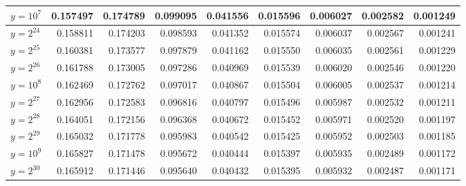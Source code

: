 \documentclass{article}
\theoremstyle{definition}
\begin{document}
\begin{table}[h!]
{\begin{tabular}{l|rrrrrrrr}
            \hline
            $y = 10^{7}$             & 0.157497 & 0.174789              & 0.099095              & 0.041556              & 0.015596              & 0.006027              & 0.002582              & 0.001249              \\
            \hline
            $y = 2^{24}$             & 0.158811 & 0.174203              & 0.098593              & 0.041352              & 0.015574              & 0.006037              & 0.002567              & 0.001241              \\
            $y = 2^{25}$             & 0.160381 & 0.173577              & 0.097879              & 0.041162              & 0.015550              & 0.006035              & 0.002561              & 0.001229              \\
            $y = 2^{26}$             & 0.161788 & 0.173005              & 0.097286              & 0.040969              & 0.015539              & 0.006020              & 0.002546              & 0.001220              \\
            \hline
            $y = 10^{8}$             & 0.162469 & 0.172762              & 0.097017              & 0.040867              & 0.015504              & 0.006005              & 0.002537              & 0.001214              \\
            \hline
            $y = 2^{27}$             & 0.162956 & 0.172583              & 0.096816              & 0.040797              & 0.015496              & 0.005987              & 0.002532              & 0.001211              \\
            $y = 2^{28}$             & 0.164051 & 0.172156              & 0.096368              & 0.040672              & 0.015452              & 0.005971              & 0.002520              & 0.001197              \\
            $y = 2^{29}$             & 0.165032 & 0.171778              & 0.095983              & 0.040542              & 0.015425              & 0.005952              & 0.002503              & 0.001185              \\
            \hline
            $y = 10^{9}$             & 0.165827 & 0.171478              & 0.095672              & 0.040444              & 0.015397              & 0.005935              & 0.002489              & 0.001172              \\
            \hline
            $y = 2^{30}$             & 0.165912 & 0.171446              & 0.095640              & 0.040432              & 0.015395              & 0.005932              & 0.002487              & 0.001171              \\

\end{tabular}}
\end{table}
\end{document}
